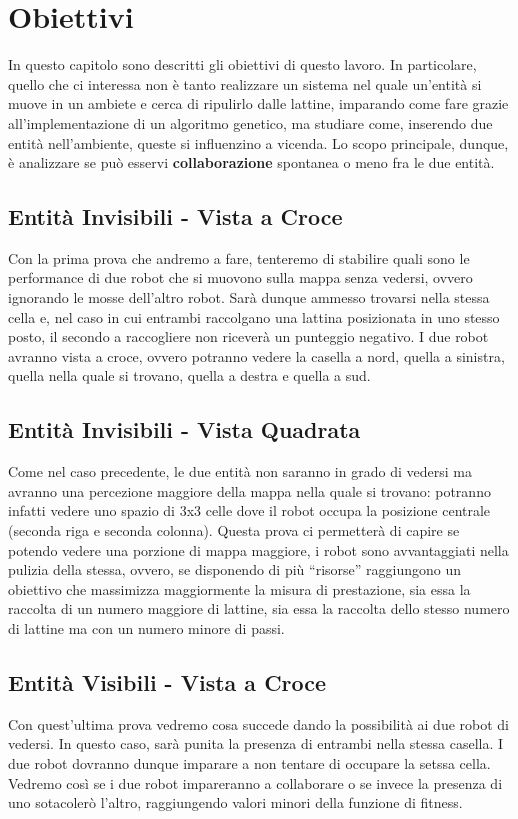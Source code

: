 \chapter{Obiettivi}
In questo capitolo sono descritti gli obiettivi di questo lavoro. In
particolare, quello che ci interessa non è tanto realizzare un sistema nel quale
un'entità si muove in un ambiete e cerca di ripulirlo dalle lattine, imparando
come fare grazie all'implementazione di un algoritmo genetico, ma studiare come,
inserendo due entità nell'ambiente, queste si influenzino a vicenda. Lo scopo
principale, dunque, è analizzare se può esservi \textbf{collaborazione}
spontanea o meno fra le due entità.

\section{Entità Invisibili - Vista a Croce}
Con la prima prova che andremo a fare, tenteremo di stabilire quali sono le
performance di due robot che si muovono sulla mappa senza vedersi, ovvero
ignorando le mosse dell'altro robot. Sarà dunque ammesso trovarsi nella stessa
cella e, nel caso in cui entrambi raccolgano una lattina posizionata in uno
stesso posto, il secondo a raccogliere non riceverà un punteggio
negativo.\newline
I due robot avranno vista a croce, ovvero potranno vedere la casella a nord,
quella a sinistra, quella nella quale si trovano, quella a destra e quella a
sud.

\section{Entità Invisibili - Vista Quadrata}
Come nel caso precedente, le due entità non saranno in grado di vedersi ma
avranno una percezione maggiore della mappa nella quale si trovano: potranno
infatti vedere uno spazio di 3x3 celle dove il robot occupa la posizione
centrale (seconda riga e seconda colonna).\newline
Questa prova ci permetterà di capire se potendo vedere una porzione di mappa
maggiore, i robot sono avvantaggiati nella pulizia della stessa, ovvero, se
disponendo di più ``risorse'' raggiungono un obiettivo che massimizza
maggiormente la misura di prestazione, sia essa la raccolta di un numero
maggiore di lattine, sia essa la raccolta dello stesso numero di lattine ma con
un numero minore di passi.

\section{Entità Visibili - Vista a Croce}
Con quest'ultima prova vedremo cosa succede dando la possibilità ai due robot
di vedersi. In questo caso, sarà punita la presenza di entrambi nella stessa
casella. I due robot dovranno dunque imparare a non tentare di occupare la
setssa cella.\newline
Vedremo così se i due robot impareranno a collaborare o se invece la presenza
di uno sotacolerò l'altro, raggiungendo valori minori della funzione di fitness.
